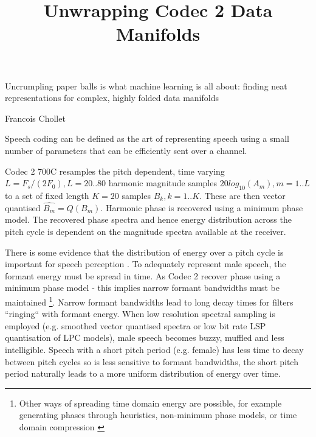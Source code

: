 \documentclass{article}
\begin{document}


\title{Unwrapping Codec 2 Data Manifolds}
\maketitle

\epigraph{Uncrumpling paper balls is what machine learning is all about: finding neat representations for complex, highly folded data manifolds}{Francois Chollet \cite{chollet2018deep}}

Speech coding can be defined as the art of representing speech using a small number of parameters that can be efficiently sent over a channel.

Codec 2 700C resamples the pitch dependent, time varying $L=F_s/(2F_0), L=20..80$ harmonic magnitude samples $20log_{10}(A_m), m=1..L$ to a set of fixed length $K=20$ samples $B_k,k=1..K$.  These are then vector quantised $\hat{B_m}=Q(B_m)$.  Harmonic phase is recovered using a minimum phase model. The recovered phase spectra and hence energy distribution across the pitch cycle is dependent on the magnitude spectra available at the receiver.

There is some evidence that the distribution of energy over a pitch cycle is important for speech perception \cite{rowe2023_ratek_study}. To adequately represent male speech, the formant energy must be spread in time.  As Codec 2 recover phase using a minimum phase model - this implies narrow formant bandwidths must be maintained \footnote{Other ways of spreading time domain energy are possible, for example generating phases through heuristics, non-minimum phase models, or time domain compression \cite{rowe2023_ratek_study}}.  Narrow formant bandwidths lead to long decay times for filters ``ringing`` with formant energy. When low resolution spectral sampling is employed (e.g. smoothed vector quantised spectra or low bit rate LSP quantisation of LPC models), male speech becomes buzzy, muffled and less intelligible.  Speech with a short pitch period (e.g. female) has less time to decay between pitch cycles so is less sensitive to formant bandwidths, the short pitch period naturally leads to a more uniform distribution of energy over time.
\end{document}
